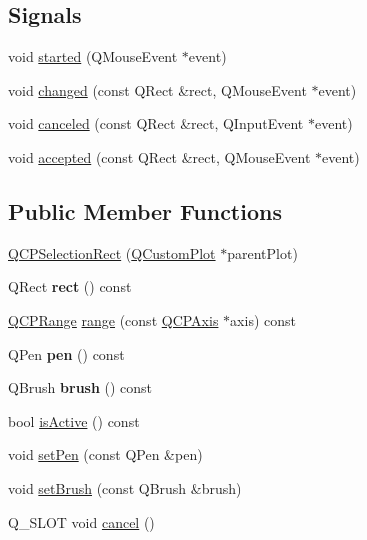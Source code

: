 \subsection*{Signals}
\begin{DoxyCompactItemize}
\item 
void \hyperlink{classQCPSelectionRect_a7b7162d19f4f2174d3644ff1a5d335aa}{started} (Q\+Mouse\+Event $\ast$event)
\item 
void \hyperlink{classQCPSelectionRect_a1bab11026bca52740c2e6682623e6964}{changed} (const Q\+Rect \&rect, Q\+Mouse\+Event $\ast$event)
\item 
void \hyperlink{classQCPSelectionRect_aeb82009393c90130102dccf36477b906}{canceled} (const Q\+Rect \&rect, Q\+Input\+Event $\ast$event)
\item 
void \hyperlink{classQCPSelectionRect_a15a43542e1f7b953a44c260b419e6d2c}{accepted} (const Q\+Rect \&rect, Q\+Mouse\+Event $\ast$event)
\end{DoxyCompactItemize}
\subsection*{Public Member Functions}
\begin{DoxyCompactItemize}
\item 
\hyperlink{classQCPSelectionRect_ade6ee59fabcc585a1e281eb527b01867}{Q\+C\+P\+Selection\+Rect} (\hyperlink{classQCustomPlot}{Q\+Custom\+Plot} $\ast$parent\+Plot)
\item 
\mbox{\label{classQCPSelectionRect_a3812115ae4dfe2855bf1e58331c14805}} 
Q\+Rect {\bfseries rect} () const
\item 
\hyperlink{classQCPRange}{Q\+C\+P\+Range} \hyperlink{classQCPSelectionRect_a23ab082ffa04be1dbf9afb9e633ab815}{range} (const \hyperlink{classQCPAxis}{Q\+C\+P\+Axis} $\ast$axis) const
\item 
\mbox{\label{classQCPSelectionRect_ab4229f8faeaffba9617d2e6c4779b765}} 
Q\+Pen {\bfseries pen} () const
\item 
\mbox{\label{classQCPSelectionRect_a9669c77c5796dea9dc089a088d50ebfb}} 
Q\+Brush {\bfseries brush} () const
\item 
bool \hyperlink{classQCPSelectionRect_ad27c1569c6ea8fa48e24b81e2a302df3}{is\+Active} () const
\item 
void \hyperlink{classQCPSelectionRect_ada20b7fb1b2dcbe50523262636b06963}{set\+Pen} (const Q\+Pen \&pen)
\item 
void \hyperlink{classQCPSelectionRect_ab0c66f1484418782efa01f4153611080}{set\+Brush} (const Q\+Brush \&brush)
\item 
Q\+\_\+\+S\+L\+OT void \hyperlink{classQCPSelectionRect_af67bc58f4f5ce9a4dc420b9c42de235a}{cancel} ()
\end{DoxyCompactItemize}
